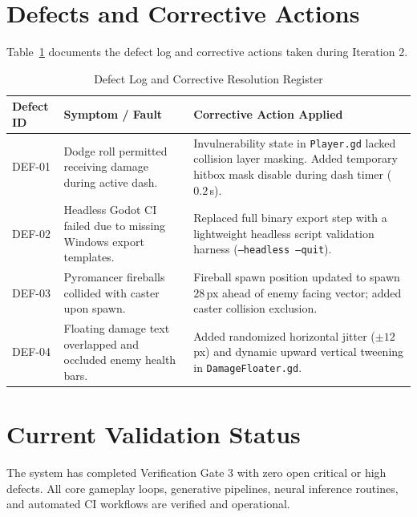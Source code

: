 \section{Defects and Corrective Actions}
Table~\ref{tab:defects} documents the defect log and corrective actions taken during Iteration 2.

\begin{table}[!htbp]
\centering
\caption{Defect Log and Corrective Resolution Register}
\label{tab:defects}
\small
\begin{tabular}{p{}p{}p{}}
\toprule
\textbf{Defect ID} & \textbf{Symptom / Fault} & \textbf{Corrective Action Applied} \\
\midrule
DEF-01 & Dodge roll permitted receiving damage during active dash. & Invulnerability state in \texttt{Player.gd} lacked collision layer masking. Added temporary hitbox mask disable during dash timer ($0.2$\,s). \\
DEF-02 & Headless Godot CI failed due to missing Windows export templates. & Replaced full binary export step with a lightweight headless script validation harness (\texttt{--headless --quit}). \\
DEF-03 & Pyromancer fireballs collided with caster upon spawn. & Fireball spawn position updated to spawn $28$\,px ahead of enemy facing vector; added caster collision exclusion. \\
DEF-04 & Floating damage text overlapped and occluded enemy health bars. & Added randomized horizontal jitter ($\pm 12$\,px) and dynamic upward vertical tweening in \texttt{DamageFloater.gd}. \\
\bottomrule
\end{tabular}
\end{table}

\section{Current Validation Status}
The system has completed Verification Gate 3 with zero open critical or high defects. All core gameplay loops, generative pipelines, neural inference routines, and automated CI workflows are verified and operational.
